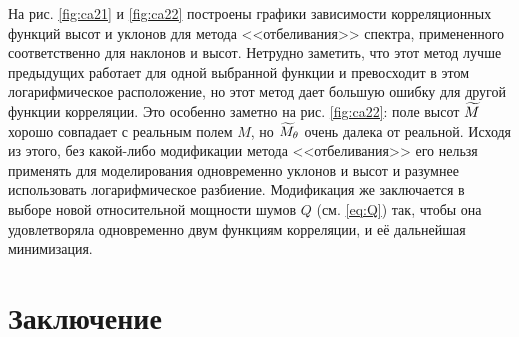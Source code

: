 На рис. \ref{fig:ca21} и \ref{fig:ca22} построены графики зависимости корреляционных функций высот и уклонов для метода <<отбеливания>> спектра, примененного соответственно для наклонов и высот. Нетрудно заметить, что этот метод лучше предыдущих работает для одной выбранной функции и превосходит в этом логарифмическое расположение, но этот метод дает большую ошибку для другой функции корреляции. Это особенно заметно на рис. \ref{fig:ca22}: поле высот $\widetilde{M}$ хорошо совпадает с реальным полем $M$, но $\widetilde{M}_{\theta}$ очень далека от реальной. Исходя из этого,  без какой-либо модификации метода <<отбеливания>> его нельзя применять для моделирования одновременно уклонов и высот и разумнее использовать логарифмическое разбиение. Модификация же заключается в выборе новой относительной мощности шумов $Q$ (см. \eqref{eq:Q}) так, чтобы она удовлетворяла одновременно двум функциям корреляции, и её дальнейшая минимизация.  




\section{Заключение}

